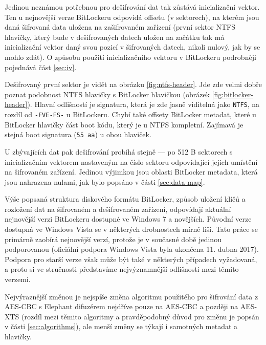 Jedinou neznámou potřebnou pro dešifrování dat tak zůstává inicializační vektor. Ten u nejnovější verze BitLockeru odpovídá offsetu (v sektorech), na kterém jsou daná šifrovaná data uložena na zašifrovaném zařízení (první sektor NTFS hlavičky, který bude v dešifrovaných datech uložen na začátku tak má inicializační vektor daný svou pozicí v šifrovaných datech, nikoli nulový, jak by se mohlo zdát). O způsobu použití inicializačního vektoru v BitLockeru podrobněji pojednává část \ref{sec:iv}.

Dešifrovaný první sektor je vidět na obrázku \ref{fig:ntfs-header}. Jde zde velmi dobře poznat podobnost NTFS hlavičky s BitLocker hlavičkou (obrázek \ref{fig:bitlocker-header}). Hlavní odlišností je signatura, která je zde jasně viditelná jako \texttt{NTFS}, na rozdíl od \texttt{-FVE-FS-} u BitLockeru. Chybí také offsety BitLocker metadat, které u BitLocker hlavičky  část boot kódu, který je u NTFS kompletní. Zajímavá je stejná boot signatura (\texttt{55 aa}) u obou hlaviček.

U zbývajících dat pak dešifrování probíhá stejně --- po 512 B sektorech s inicializačním vektorem nastaveným na číslo sektoru odpovídající jejich umístění na šifrovaném zařízení. Jedinou výjimkou jsou oblasti BitLocker metadata, která jsou nahrazena nulami, jak bylo popsáno v části \ref{sec:data-map}.

\label{sec:old-versions}

Výše popsaná struktura diskového formátu BitLocker, způsob uložení klíčů a rozložení dat na šifrovaném a dešifrovaném zařízení, odpovídají aktuální nejnovější verzi BitLockeru dostupné ve Windows 7 a novějších. Původní verze dostupná ve Windows Vista se v některých drobnostech mírně liší. Tato práce se primárně zaobírá nejnovější verzí, protože je v současné době jedinou podporovanou (oficiální podpora Windows Vista byla ukončena 11. dubna 2017\cite{hfTs55csrXKY7b4F}). Podpora pro starší verze však může být také v některých případech vyžadovaná, a proto si ve stručnosti představíme nejvýznamnější odlišnosti mezi těmito verzemi.

Nejvýraznější změnou je nejspíše změna algoritmu použitého pro šifrování data z AES-CBC s Elephant difuzérem nejdříve pouze na AES-CBC\cite{Rosendorf2013} a později na AES-XTS\cite{Sosnowski2016} (rozdíl mezi těmito algoritmy a pravděpodobný důvod pro změnu je popsán v části \ref{sec:algorithms}), ale menší změny se týkají i samotných metadat a hlavičky.


